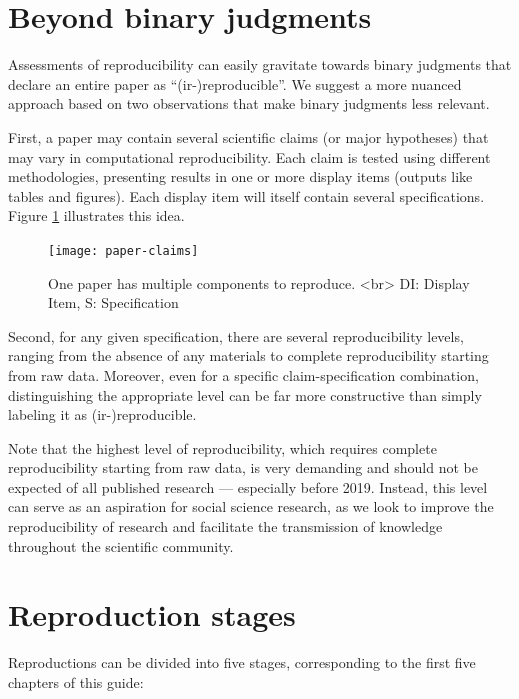 \documentclass[
  openany]{book}
\begin{document}
\hypertarget{beyond-binary-judgments}{%
\section*{Beyond binary judgments}\label{beyond-binary-judgments}}

Assessments of reproducibility can easily gravitate towards binary judgments that declare an entire paper as ``(ir-)reproducible''. We suggest a more nuanced approach based on two observations that make binary judgments less relevant.

First, a paper may contain several scientific claims (or major hypotheses) that may vary in computational reproducibility. Each claim is tested using different methodologies, presenting results in one or more display items (outputs like tables and figures). Each display item will itself contain several specifications. Figure \ref{fig:diagram} illustrates this idea.

\begin{figure}
\texttt{[image: paper-claims]} \caption{One paper has multiple components to reproduce. <br> DI: Display Item, S: Specification }\label{fig:diagram}
\end{figure}

Second, for any given specification, there are several reproducibility levels, ranging from the absence of any materials to complete reproducibility starting from raw data. Moreover, even for a specific claim-specification combination, distinguishing the appropriate level can be far more constructive than simply labeling it as (ir-)reproducible.

Note that the highest level of reproducibility, which requires complete reproducibility starting from raw data, is very demanding and should not be expected of all published research --- especially before 2019. Instead, this level can serve as an aspiration for social science research, as we look to improve the reproducibility of research and facilitate the transmission of knowledge throughout the scientific community.

\hypertarget{reproduction-stages}{%
\section*{Reproduction stages}\label{reproduction-stages}}

Reproductions can be divided into five stages, corresponding to the first five chapters of this guide:
\end{document}
